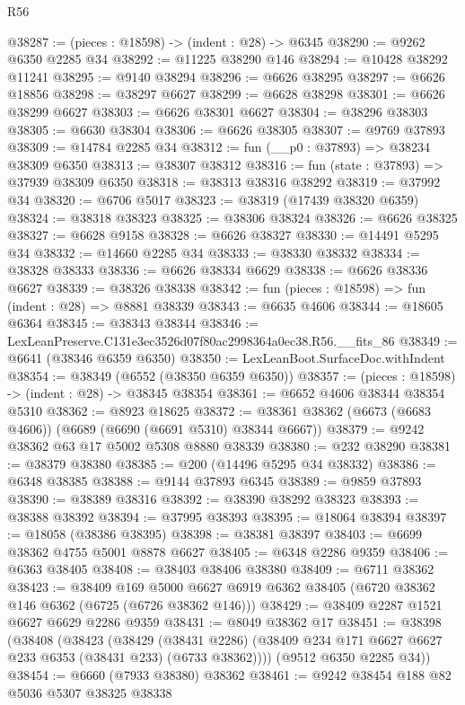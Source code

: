 \begin{lexlean}{R56}
\begin{coremodule}
@38287 := (pieces : @18598) -> (indent : @28) -> @6345
@38290 := @9262 @6350 @2285 @34
@38292 := @11225 @38290 @146
@38294 := @10428 @38292 @11241
@38295 := @9140 @38294
@38296 := @6626 @38295
@38297 := @6626 @18856
@38298 := @38297 @6627
@38299 := @6628 @38298
@38301 := @6626 @38299 @6627
@38303 := @6626 @38301 @6627
@38304 := @38296 @38303
@38305 := @6630 @38304
@38306 := @6626 @38305
@38307 := @9769 @37893
@38309 := @14784 @2285 @34
@38312 := fun (__p0 : @37893) => @38234 @38309 @6350
@38313 := @38307 @38312
@38316 := fun (state : @37893) => @37939 @38309 @6350
@38318 := @38313 @38316 @38292
@38319 := @37992 @34
@38320 := @6706 @5017
@38323 := @38319 (@17439 @38320 @6359)
@38324 := @38318 @38323
@38325 := @38306 @38324
@38326 := @6626 @38325
@38327 := @6628 @9158
@38328 := @6626 @38327
@38330 := @14491 @5295 @34
@38332 := @14660 @2285 @34
@38333 := @38330 @38332
@38334 := @38328 @38333
@38336 := @6626 @38334 @6629
@38338 := @6626 @38336 @6627
@38339 := @38326 @38338
@38342 := fun (pieces : @18598) => fun (indent : @28) => @8881 @38339
@38343 := @6635 @4606
@38344 := @18605 @6364
@38345 := @38343 @38344
@38346 := LexLeanPreserve.C131e3ec3526d07f80ac2998364a0ec38.R56.__fits_86
@38349 := @6641 (@38346 @6359 @6350)
@38350 := LexLeanBoot.SurfaceDoc.withIndent
@38354 := @38349 (@6552 (@38350 @6359 @6350))
@38357 := (pieces : @18598) -> (indent : @28) -> @38345 @38354
@38361 := @6652 @4606 @38344 @38354 @5310
@38362 := @8923 @18625
@38372 := @38361 @38362 (@6673 (@6683 @4606)) (@6689 (@6690 (@6691 @5310) @38344 @6667))
@38379 := @9242 @38362 @63 @17 @5002 @5308 @8880 @38339
@38380 := @232 @38290
@38381 := @38379 @38380
@38385 := @200 (@14496 @5295 @34 @38332)
@38386 := @6348 @38385
@38388 := @9144 @37893 @6345
@38389 := @9859 @37893
@38390 := @38389 @38316
@38392 := @38390 @38292 @38323
@38393 := @38388 @38392
@38394 := @37995 @38393
@38395 := @18064 @38394
@38397 := @18058 (@38386 @38395)
@38398 := @38381 @38397
@38403 := @6699 @38362 @4755 @5001 @8878 @6627
@38405 := @6348 @2286 @9359
@38406 := @6363 @38405
@38408 := @38403 @38406 @38380
@38409 := @6711 @38362
@38423 := @38409
    @169
    @5000
    @6627
    @6919
    @6362
    @38405
    (@6720 @38362 @146 @6362 (@6725 (@6726 @38362 @146)))
@38429 := @38409 @2287 @1521 @6627 @6629 @2286 @9359
@38431 := @8049 @38362 @17
@38451 := @38398
    (@38408
      (@38423
        (@38429
          (@38431 @2286)
          (@38409 @234 @171 @6627 @6627 @233 @6353 (@38431 @233) (@6733 @38362))))
      (@9512 @6350 @2285 @34))
@38454 := @6660 (@7933 @38380) @38362
@38461 := @9242 @38454 @188 @82 @5036 @5307 @38325 @38338

\end{coremodule}
\end{lexlean}
